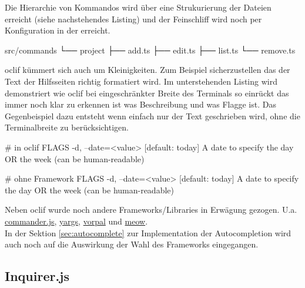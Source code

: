 \documentclass[oneside,bibliography=totocnumbered,BCOR=5mm]{scrbook}
\newenvironment{code}{\captionsetup{type=listing, skip=0pt}}{}
\begin{document}
Die Hierarchie von Kommandos wird über eine Strukurierung der Dateien erreicht (siehe nachstehendes Listing) und der Feinschliff wird noch per Konfiguration in der  erreicht.

\begin{code}
  \begin{shellcode}
 src/commands
 └── project
     ├── add.ts
     ├── edit.ts
     ├── list.ts
     └── remove.ts
  \end{shellcode}
  \medskip
\end{code}

oclif kümmert sich auch um Kleinigkeiten. Zum Beispiel sicherzustellen das der
Text der Hilfsseiten richtig formatiert wird. Im unterstehenden Listing wird
demonstriert wie oclif bei eingeschränkter Breite des Terminals so einrückt
das immer noch klar zu erkennen ist was Beschreibung und was Flagge ist. Das
Gegenbeispiel dazu entsteht wenn einfach nur der Text geschrieben wird, ohne die
Terminalbreite zu berücksichtigen.

\begin{code}
  \begin{shellcode}
# in oclif
FLAGS
  -d, --date=<value>  [default: today] A date to specify the day OR
                      the week (can be human-readable)

# ohne Framework
FLAGS
  -d, --date=<value>  [default: today] A date to specify the day OR
the week (can be human-readable)
  \end{shellcode}
  \label{lst:oclif-umbruch}
  \medskip
\end{code}

\medskip

Neben oclif wurde noch andere Frameworks/Libraries in Erwägung gezogen. U.a.
\href{https://github.com/tj/commander.js}{commander.js},
\href{https://github.com/yargs/yargs}{yargs},
\href{https://github.com/dthree/vorpal}{vorpal} und
\href{https://github.com/sindresorhus/meow}{meow}.
\\
In der Sektion \ref{sec:autocomplete} zur Implementation der Autocompletion wird
auch noch auf die Auswirkung der Wahl des Frameworks eingegangen.

\subsection{Inquirer.js}
\end{document}
